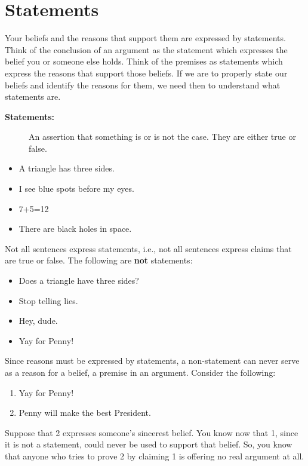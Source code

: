 \documentclass[report,oneside]{memoir}
\begin{document}
\section{Statements}
\label{statements}

Your beliefs and the reasons that support them are expressed by statements. Think of the conclusion of an argument as the statement which expresses the belief you or someone else holds. Think of the premises as statements which express the reasons that support those beliefs. If we are to properly state our beliefs and identify the reasons for them, we need then to understand what statements are. 

\begin{description}

\item[\textbf{Statements:}]

An assertion that something is or is not the case. They are either true or false.
\end{description}
\begin{itemize}
\item A triangle has three sides.

\item I see blue spots before my eyes.

\item 7+5=12

\item There are black holes in space.

\end{itemize}
Not all sentences express statements, i.e., not all sentences express claims that are true or false. The following are \textbf{not} statements:

\begin{itemize}
\item Does a triangle have three sides?

\item Stop telling lies.

\item Hey, dude.

\item Yay for Penny!

\end{itemize}
Since reasons must be expressed by statements, a non-statement can never serve as a reason for a belief, a premise in an argument. Consider the following: 

\begin{enumerate}
\item Yay for Penny!

\item Penny will make the best President.

\end{enumerate}
Suppose that 2 expresses someone's sincerest belief. You know now that 1, since it is not a statement, could never be used to support that belief. So, you know that anyone who tries to prove 2 by claiming 1 is offering no real argument at all. 
\end{document}
